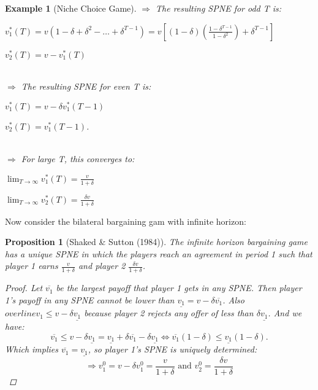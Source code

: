 \documentclass[12pt]{extreport} %
\theoremstyle{named}
\theoremstyle{itshape}
\theoremstyle{normal}
\newtheorem{example}[unnamedtheorem]{Example}
\newtheorem{proposition}[unnamedtheorem]{Proposition}
\begin{document}
\begin{example}[Niche Choice Game]
  $\Rightarrow$ The resulting SPNE for odd T is:
	\begin{description}
		\item $v_1^*(T) = v(1 - \delta + \delta^2 - \dotsc + \delta^{T-1}) = v \left[ (1 - \delta) \left(\frac{1 - \delta^{T-1}}{1 - \delta^2} \right) + \delta^{T-1} \right]$
		\item $v_2^*(T) = v - v_1^*(T)$
	\end{description} ~\\
  $\Rightarrow$ The resulting SPNE for even T is:
	\begin{description}
		\item $v_1^*(T) = v - \delta v_1^*(T-1)$
		\item $v_2^*(T) = v_1^*(T - 1)$.
	\end{description} ~\\
  $\Rightarrow$ For large T, this converges to:
  \begin{description}
  	\item $\lim_{T \rightarrow \infty} v_1^*(T) = \frac{v}{1 + \delta}$
  	\item $\lim_{T \rightarrow \infty} v_2^*(T) = \frac{\delta v}{1 + \delta}$
  \end{description}
\end{example}

Now consider the bilateral bargaining gam with infinite horizon:

\begin{proposition}[Shaked \& Sutton (1984)]
	The infinite horizon bargaining game has a unique SPNE in which the players reach an agreement in period 1 such that player 1 earns $\frac{v}{1 + \delta}$ and player 2 $\frac{\delta v}{1 + \delta}$.
	
	\begin{proof}
		Let $\overline{v_1}$ be the largest payoff that player 1 gets in any SPNE. Then player 1's payoff in any SPNE cannot be lower than $\underline{v_1} = v - \delta \overline{v_1}$. Also $overline{v_1} \leq v - \delta \underline{v_1}$ because player 2 rejects any offer of less than $\delta \underline{v_1}$. And we have:
		$$ \overline{v_1} \leq v - \delta \underline{v_1} = \underline{v_1} + \delta \overline{v_1} - \delta \underline{v_1} \iff \overline{v_1} (1 - \delta) \leq \underline{v_1} (1 - \delta). $$
		Which implies $\overline{v_1} = \underline{v_1}$, so player 1's SPNE is uniquely determined:
		$$ \Rightarrow v_1^0 = v - \delta v_1^0 = \frac{v}{1 + \delta} \text{ and } v_2^0 = \frac{\delta v}{1 + \delta} $$ 
	\end{proof}
\end{proposition}
\end{document}
